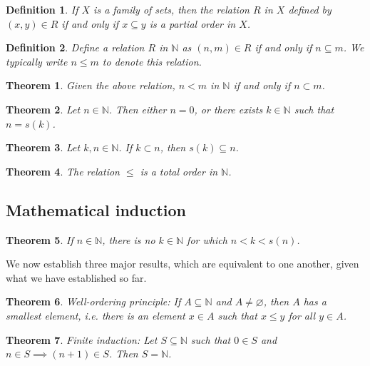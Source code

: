 \documentclass[a4paper]{article}
\newtheorem{mytheorem}{Theorem}
\newtheorem{mydef}{Definition}
\numberwithin{mytheorem}{section}
\numberwithin{mydef}{section}
\numberwithin{axiom}{section}
\numberwithin{example}{section}
\begin{document}
\begin{mydef} If $X$ is a family of sets, then the relation $R$ in $X$ defined by $(x,y) \in R$ if and only if $x \subseteq y$ is a partial order in $X$.
\end{mydef}

\begin{mydef} Define a relation $R$ in $\mathbb{N}$ as $(n,m) \in R$ if and only if $n \subseteq m$. We typically write $n \leq m$ to denote this relation. 
\end{mydef}

\begin{mytheorem} Given the above relation, $n < m$ in $\mathbb{N}$ if and only if $n \subset m$. 
\end{mytheorem}

\begin{mytheorem} Let $n \in \mathbb{N}$. Then either $n = 0$, or there exists $k \in \mathbb{N}$ such that $n = s(k)$.
\end{mytheorem}

\begin{mytheorem} Let $k,n \in \mathbb{N}$. If $k \subset n$, then $s(k) \subseteq n$.
\end{mytheorem}

\begin{mytheorem} The relation $\leq$ is a total order in $\mathbb{N}$. 
\end{mytheorem}

\subsection{Mathematical induction}

\begin{mytheorem} If $n \in \mathbb{N}$, there is no $k \in \mathbb{N}$ for which $n < k < s(n)$. 
\end{mytheorem}
We now establish three major results, which are equivalent to one another, given what we have established so far.

\begin{mytheorem} Well-ordering principle: If $A \subseteq \mathbb{N}$ and $A \neq \varnothing$, then $A$ has a smallest element, i.e. there is an element $x \in A$ such that $x \leq y$ for all $y \in A$.
\end{mytheorem}

\begin{mytheorem} Finite induction: Let $S \subseteq \mathbb{N}$ such that $0 \in S$ and $n \in S \implies (n+1) \in S$. Then $S = \mathbb{N}$.
\end{mytheorem}
\end{document}
